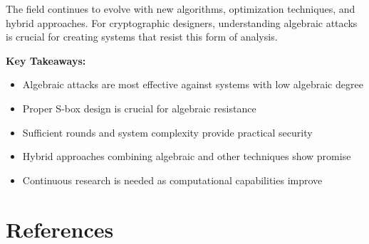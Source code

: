 \documentclass[12pt,a4paper]{article}
\begin{document}
The field continues to evolve with new algorithms, optimization techniques, and hybrid approaches. For cryptographic designers, understanding algebraic attacks is crucial for creating systems that resist this form of analysis.

\textbf{Key Takeaways:}
\begin{itemize}
    \item Algebraic attacks are most effective against systems with low algebraic degree
    \item Proper S-box design is crucial for algebraic resistance
    \item Sufficient rounds and system complexity provide practical security
    \item Hybrid approaches combining algebraic and other techniques show promise
    \item Continuous research is needed as computational capabilities improve
\end{itemize}

\section{References}
\end{document}
